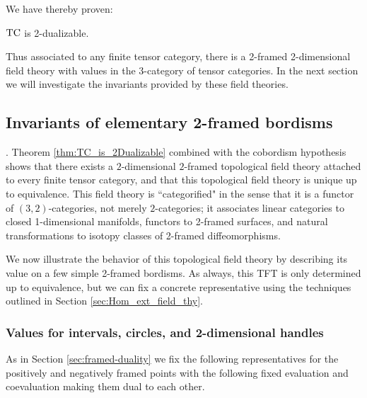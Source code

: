 \documentclass{amsart}
\begin{document}
We have thereby proven:
\begin{maintheorem} \label{thm:TC_is_2Dualizable}
	$\mathrm{TC}$ is 2-dualizable. 
\end{maintheorem}

\nid Thus associated to any finite tensor category, there is a 2-framed 2-dimensional field theory with values in the 3-category of tensor categories.  In the next section we will investigate the invariants provided by these field theories.

\subsection{Invariants of elementary 2-framed bordisms}
.%
Theorem \ref{thm:TC_is_2Dualizable} combined with the cobordism hypothesis shows that there exists a $2$-dimensional $2$-framed topological field theory attached to every finite tensor category, and that this topological field theory is unique up to equivalence.  This field theory is ``categorified" in the sense that it is a functor of $(3,2)$-categories, not merely $2$-categories; it associates linear categories to closed 1-dimensional manifolds, functors to 2-framed surfaces, and natural transformations to isotopy classes of 2-framed diffeomorphisms. 

We now illustrate the behavior of this topological field theory by describing its value on a few simple 2-framed bordisms.  As always, this TFT is only determined up to equivalence, but we can fix a concrete representative using the techniques outlined in Section \ref{sec:Hom_ext_field_thy}.

\subsubsection{Values for intervals, circles, and 2-dimensional handles}

As in Section \ref{sec:framed-duality} we fix the following representatives for the positively and negatively framed points with the following fixed evaluation and coevaluation making them dual to each other.
\end{document}
